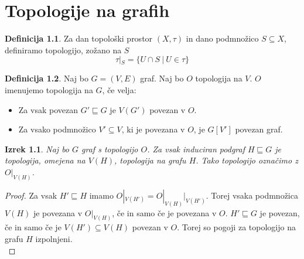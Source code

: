 \documentclass[a4paper, 12pt]{book}
\newtheorem{theorem}{Izrek}[section]
\theoremstyle{definition}
\newtheorem{definition}{Definicija}[section]
\begin{document}
\chapter{Topologije na grafih}
\begin{definition}
  Za dan topološki prostor $(X, \tau)$ in dano podmnožico $S \subseteq X$, definiramo
  topologijo, zožano na $S$ \[\tau|_S = \{U \cap S\ |\ U \in \tau\}\]
\end{definition}
\begin{definition}
  Naj bo $G = (V,E)$ graf. Naj bo $O$ topologija na $V$. $O$ imenujemo topologija
  na $G$, če velja:
  \begin{itemize}
    \item[(1)] Za vsak povezan $G' \sqsubseteq G$ je $V(G')$ povezan v $O$.
    \item[(2)] Za vsako podmnožico $V' \subseteq V$, ki je povezana v $O$, je $G[V']$ povezan graf.
  \end{itemize}
\end{definition}
\begin{theorem}\label{theorem1}
  Naj bo $G$ graf s topologijo $O$. Za vsak induciran podgraf $H \sqsubseteq G$ je topologija,
  omejena na $V(H)$, topologija na grafu $H$. Tako topologijo označimo z $O|_{V(H)}$.
\end{theorem}
\begin{proof}
  Za vsak $H' \sqsubseteq H$ imamo $O|_{V(H')} = O|_{V(H)}|_{V(H')}$. Torej vsaka
  podmnožica $V(H)$ je povezana v $O|_{V(H)}$, če in samo če je povezana v $O$.
  $H' \sqsubseteq G$ je povezan, če in samo če je $V(H') \subseteq V(H)$ povezan v $O$.
  Torej so pogoji za topologijo na grafu $H$ izpolnjeni. \\
\end{proof}
\end{document}
